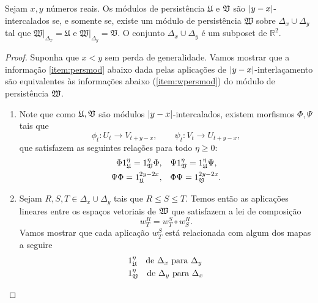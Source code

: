 \begin{propo}\label{teo:prop_inter}
Sejam $x,y$ números reais. Os módulos de persistência $\mathfrak{U}$ 
e $\mathfrak{V}$ são $\left\lvert y-x\right\rvert$-intercalados se, e somente se, existe 
um módulo de persistência $\mathfrak{W}$ sobre $\Delta_x \cup
\Delta_y$ tal que $\left.\mathfrak{W}\right|_{\Delta_x} = 
\mathfrak{U}$ e  $\left.\mathfrak{W}\right|_{\Delta_y} = 
\mathfrak{V}$. O conjunto $\Delta_x \cup \Delta_y$ é um subposet
de $\mathbb{R}^2$.  
\end{propo}
\begin{proof}
Suponha que $x < y$ sem perda de generalidade. Vamos mostrar que a informação
\ref{item:persmod} abaixo dada pelas aplicações de $\left\lvert y-x\right\rvert$-interlaçamento
são equivalentes
às informações abaixo (\ref{item:wpersmod}) do módulo de persistência $\mathfrak{W}$. 
\begin{enumerate}
    \item \label{item:persmod} Note que como $\mathfrak{U}, \mathfrak{V}$ são módulos 
    $\left\lvert y-x\right\rvert$-intercalados, existem morfismos $\Phi, \Psi$ tais que 
    \begin{equation*}
        \phi_t \colon U_t \to V_{t+y-x}, \qquad \psi_t \colon V_t \to U_{t+y-x},
    \end{equation*}
    que satisfazem as seguintes relações para todo $\eta \geq 0$:
    \begin{equation}\label{eq:rel_uv}
        \begin{split}
        \Phi 1^\eta_{\mathfrak{U}} = 1^\eta_{\mathfrak{V}} \Phi, & \quad \Psi 1^\eta_{\mathfrak{V}} = 1^\eta_{\mathfrak{U}} \Psi, \\
        \Psi \Phi = 1^{2y-2x}_{\mathfrak{U}}, & \quad \Phi \Psi = 1^{2y-2x}_{\mathfrak{V}}.
        \end{split}
    \end{equation}
    \item \label{item:wpersmod} Sejam $R,S,T \in \Delta_x \cup \Delta_y$ tais que $R \leq 
    S \leq T$. Temos então as aplicações lineares entre os espaços vetoriais de $\mathfrak{W}$ 
    que satisfazem a lei de composição
    \begin{equation*}
        w^R_T = w^S_T \circ w^R_S.
    \end{equation*}
    Vamos mostrar que cada aplicação $w^S_T$ está relacionada com algum dos mapas a seguire
    \begin{align*}
        & 1^\eta_\fraku \quad \text{de } \Delta_x \text{ para } \Delta_y \\
        & 1^\eta_\frakv \quad \text{de } \Delta_y \text{ para } \Delta_x \\

\end{align*}
\end{enumerate}
\end{proof}
